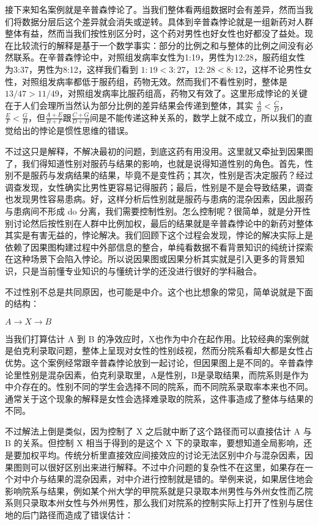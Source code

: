 \documentclass[]{tufte-book}
\begin{document}
接下来知名案例就是辛普森悖论了。当我们整体看两组数据时会有差异，然而当我们将数据分层后这个差异就会消失或逆转。具体到辛普森悖论就是一组新药对人群整体有益，然而当我们按性别区分时，这个药对男性也好女性也好都没了益处。现在比较流行的解释是基于一个数学事实：部分的比例之和与整体的比例之间没有必然联系。在辛普森悖论中，对照组发病率女性为1:19，男性为12:28，服药组女性为3:37，男性为8:12，这样我们看到 \(1:19 < 3:27\)，\(12:28 < 8:12\)，这样不论男性女性，对照组发病率都低于服药组，药物无效。然而我们不看性别时，整体是\(13/47>11/49\)，对照组发病率比服药组高，药物又有效了。这里形成悖论的关键在于人们会理所当然认为部分比例的差异结果会传递到整体，其实 \(\frac{A}{B}<\frac{C}{D}\)， \(\frac{E}{F}<\frac{G}{H}\)，但\(\frac{A+E}{B+F}\)跟\(\frac{C+G}{D+H}\)间是不能传递这种关系的，数学上就不成立，所以我们的直觉给出的悖论是惯性思维的错误。

不过这只是解释，不解决最初的问题，到底这药有用没用。这里就又牵扯到因果图了，我们得知道性别对服药与结果的影响，也就是说得知道性别的角色。首先，性别不是服药与发病结果的结果，毕竟不是变性药；其次，性别是否决定服药？经过调查发现，女性确实比男性更容易记得服药；最后，性别是不是会导致结果，调查也发现男性容易患病。好，这样分析后性别就是服药与患病的混杂因素，因此服药与患病间不形成 do 分离，我们需要控制性别。怎么控制呢？很简单，就是分开性别讨论然后按性别在人群中比例加权，最后的结果就是辛普森悖论中的新药对整体其实是有害无益的，悖论解决。我们回顾下这个过程会发现，悖论的解决实际上是依赖了因果图构建过程中外部信息的整合，单纯看数据不看背景知识的纯统计探索在这种场景下会陷入悖论。所以说因果图或因果分析其实就是引入更多的背景知识，只是当前懂专业知识的与懂统计学的还没进行很好的学科融合。

不过性别不总是共同原因，也可能是中介。这个也比想象的常见，简单说就是下面的结构：

\(A \rightarrow X \rightarrow B\)

当我们打算估计 A 到 B 的净效应时，X也作为中介在起作用。比较经典的案例就是伯克利录取问题，整体上呈现对女性的性别歧视，然而分院系看却大都是女性占优势。这个案例经常跟辛普森悖论放到一起讨论，但因果图上是不同的。辛普森悖论里性别是混杂因素，伯克利录取里，A是性别，B是录取结果，而院系则是作为中介存在的。性别不同的学生会选择不同的院系，而不同院系录取率本来也不同。通常关于这个现象的解释是女性会选择难录取的院系，这件事造成了整体与结果的不同。

不过解法上倒是类似，因为控制了 X 之后就中断了这个路径而可以直接估计 A 与 B 的关系。但控制 X 相当于得到的是这个 X 下的录取率，要想知道全局影响，还是要加权平均。传统分析里直接效应间接效应的讨论无法区别中介与混杂因素，因果图则可以很好区别出来进行解释。不过中介问题的复杂性不在这里，如果存在一个对中介与结果的混杂因素，对中介进行控制就是错的。举例来说，如果居住地会影响院系与结果，例如某个州大学的甲院系就是只录取本州男性与外州女性而乙院系则只录取本州女性与外州男性，那么我们对院系的控制实际上打开了性别与居住地的后门路径而造成了错误估计：
\end{document}
